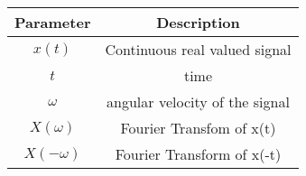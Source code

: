 \renewcommand{\arraystretch}{1.5}
\begin{tabular}{|c|c|}
\hline
Parameter & Description  \\\hline
\( x(t) \) & Continuous real valued signal  \\\hline
\(t \) & time \\\hline
\(\omega \) & angular velocity of the signal \\\hline
\(X(\omega)\)& Fourier Transfom of x(t)\\\hline
\(X(-\omega)\)& Fourier Transform of x(-t)\\\hline
\end{tabular}
